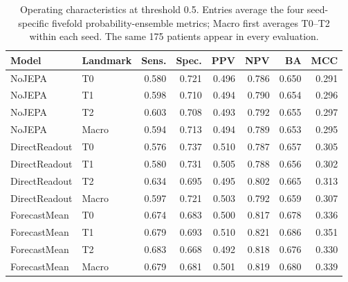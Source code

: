 \begin{table}[t]
\centering
\small
\caption{Operating characteristics at threshold 0.5. Entries average the four seed-specific fivefold probability-ensemble metrics; Macro first averages T0--T2 within each seed. The same 175 patients appear in every evaluation.}
\label{tab:extended_operating}
\begin{tabular}{llrrrrrr}
\toprule
Model & Landmark & Sens. & Spec. & PPV & NPV & BA & MCC \\
\midrule
NoJEPA & T0 & 0.580 & 0.721 & 0.496 & 0.786 & 0.650 & 0.291 \\
NoJEPA & T1 & 0.598 & 0.710 & 0.494 & 0.790 & 0.654 & 0.296 \\
NoJEPA & T2 & 0.603 & 0.708 & 0.493 & 0.792 & 0.655 & 0.297 \\
NoJEPA & Macro & 0.594 & 0.713 & 0.494 & 0.789 & 0.653 & 0.295 \\
\midrule
DirectReadout & T0 & 0.576 & 0.737 & 0.510 & 0.787 & 0.657 & 0.305 \\
DirectReadout & T1 & 0.580 & 0.731 & 0.505 & 0.788 & 0.656 & 0.302 \\
DirectReadout & T2 & 0.634 & 0.695 & 0.495 & 0.802 & 0.665 & 0.313 \\
DirectReadout & Macro & 0.597 & 0.721 & 0.503 & 0.792 & 0.659 & 0.307 \\
\midrule
ForecastMean & T0 & 0.674 & 0.683 & 0.500 & 0.817 & 0.678 & 0.336 \\
ForecastMean & T1 & 0.679 & 0.693 & 0.510 & 0.821 & 0.686 & 0.351 \\
ForecastMean & T2 & 0.683 & 0.668 & 0.492 & 0.818 & 0.676 & 0.330 \\
ForecastMean & Macro & 0.679 & 0.681 & 0.501 & 0.819 & 0.680 & 0.339 \\
\bottomrule
\end{tabular}
\end{table}

